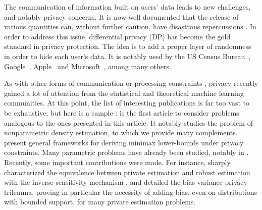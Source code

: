 \documentclass[10pt]{article} %
\begin{document}
The communication of information built on users' data leads to new challenges, and notably privacy concerns. It is now well documented that the release of various quantities can, without further caution, have disastrous repercussions \citep{narayanan2006break,backstrom2007wherefore,fredrikson2015model,dinur2003revealing,homer2008resolving,loukides2010disclosure,narayanan2008robust,sweeney2000simple,gonon2023sparsity,wagner2018technical,sweeney2002k}.
In order to address this issue, differential privacy (DP) \citep{dwork2006calibrating} has become the gold standard in privacy protection. The idea is to add a proper layer of randomness %
in order to hide each user's data. It is notably used by the US Census Bureau~\citep{abowd2018us}, Google~\citep{erlingsson2014rappor}, Apple~\citep{thakurta2017learning} and Microsoft~\citep{ding2017collecting}, among many others. 

As with other forms of communication or processing constraints \citep{BarnesHO19,BarnesHO20,AcharyaCST21a,AcharyaCMT21,AcharyaCST21b,AcharyaCFST21}, privacy recently gained a lot of attention from the statistical and theoretical machine learning communities. At this point, the list of interesting publications is far too vast to be exhaustive, but here is a sample : \citet{wasserman2010statistical} is the first article to consider problems analogous to the ones presented in this article. It notably studies the problem of nonparametric density estimation, to which we provide many complements. \citet{duchi2013localpreprint,duchi2013local,duchi2018minimax,barber2014privacy,acharya2021differentially,lalanne2022statistical} present general frameworks for deriving minimax lower-bounds under privacy constraints. Many parametric problems have already been studied, notably in \citet{acharya2018differentially,acharya2021differentially,karwa2017finite,kamath2019highdimensional,biswas2020coinpress,lalanne2022private,lalanne2023private,kamath2022improved,singhal2023polynomial}. Recently, some important contributions were made. For instance, \citet{asi2023robustness} sharply characterized the equivalence between private estimation and robust estimation with the inverse sensitivity mechanism \citep{asi2020near,asi2021nips}, and \citet{kamath2023biasvarianceprivacy} detailed the bias-variance-privacy trilemma, proving in particular the necessity of adding bias, even on distributions with bounded support, for many private estimation problems.
\end{document}
